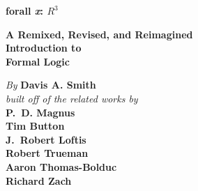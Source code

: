 

\pagestyle{empty}

\vspace*{80pt}

\begin{raggedleft}
\fontsize{30pt}{24pt}\sffamily
\selectfont
  \textbf{forall 
  {\fontsize{37pt}{24pt}\selectfont\rmfamily\textit{x}}: 
  $R^3$}

\medskip\fontsize{18pt}{20pt}\selectfont

\textbf{A Remixed, Revised, and Reimagined\\Introduction to\\ Formal Logic}

\vfill
\fontsize{12pt}{16pt}\selectfont \textit{By }  \textbf{Davis A. Smith}\\
     \textit{built off of the related works by}\\
      \textbf{P.~D. Magnus}\\
      \textbf{Tim Button}\\
      \textbf{J.~Robert Loftis}\\
      \textbf{Robert Trueman}\\
      \textbf{Aaron Thomas-Bolduc}\\
      \textbf{Richard Zach}\par


\vfill
\textbf{\forallxversion}\par
\end{raggedleft}


\newpage


